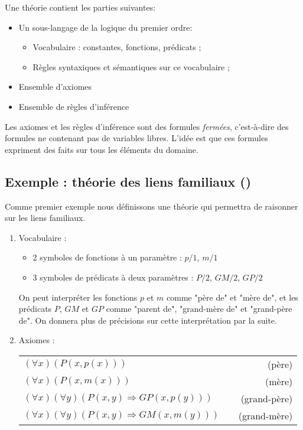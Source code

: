 {Une théorie contient les parties suivantes:
\begin{itemize}
\item Un sous-langage de la logique du premier ordre:
\begin{itemize}
\item Vocabulaire : constantes, fonctions, prédicats ;
\item Règles syntaxiques et sémantiques sur ce vocabulaire ;
\end{itemize}
\item Ensemble d'axiomes
\item Ensemble de règles d'inférence
\end{itemize}
Les axiomes et les règles d'inférence sont des
formules {\em fermées}, c'est-à-dire des formules ne contenant pas de variables libres.
L'idée est que ces formules expriment des faits sur tous les éléments du domaine.

\subsection{Exemple : théorie des liens familiaux ()}

Comme premier exemple
nous définissons une théorie qui permettra de raisonner sur les liens familiaux.

\begin{enumerate}
\item Vocabulaire : 
\begin{itemize}
\item 2 symboles de fonctions à un paramètre : $p/1$, $m/1$
\item 3 symboles de prédicats à deux paramètres : $P/2$, $GM/2$, $GP/2$\\
\end{itemize}
On peut interpréter les fonctions $p$ et $m$ comme "père de" et "mère de", et les prédicats $P$, $GM$ et $GP$ comme "parent de", "grand-mère de" et "grand-père de". On donnera plus de précisions sur cette interprétation par la suite.\\

\item Axiomes :
\begin{center}
\begin{tabular}{lcr}
$(\forall x) \left(P(x,p(x))\right)$ & \hspace*{2cm}& (père)\\
$(\forall x) \left(P(x,m(x))\right)$ & \hspace*{2cm}& (mère)\\
$(\forall x)(\forall y) \left(P(x,y)\Rightarrow GP(x,p(y)) \right)$&& (grand-père)\\
$(\forall x)(\forall y) \left(P(x,y)\Rightarrow GM(x,m(y)) \right)$&& (grand-mère)\\
\end{tabular}
\end{center}
\vspace{\baselineskip}


\end{enumerate}}
